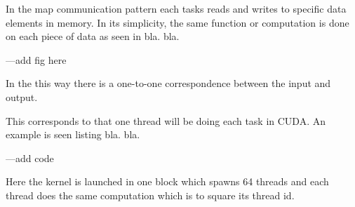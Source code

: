 In the map communication pattern each tasks reads and writes to specific data elements in memory.
In its simplicity, the same function or computation is done on each piece of data as seen in bla. bla.

---add fig here

In the this way there is a one-to-one correspondence between the input and output.

This corresponds to that one thread will be doing each task in CUDA.
An example is seen listing bla. bla.

---add code

Here the kernel is launched in one block which spawns 64 threads and each thread does the same computation which is to square its thread id.